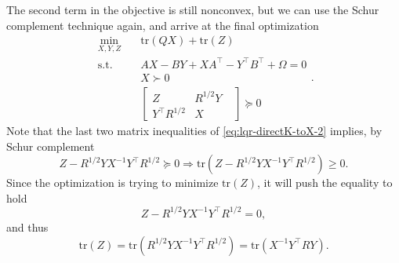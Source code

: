 \documentclass[
]{book}
\theoremstyle{definition}
\theoremstyle{definition}
\theoremstyle{definition}
\theoremstyle{definition}
\theoremstyle{remark}
\begin{document}
The second term in the objective is still nonconvex, but we can use the Schur complement technique again, and arrive at the final optimization
\begin{equation}
\begin{split}
\min_{X,Y,Z} & \quad \mathrm{tr}(QX) + \mathrm{tr}(Z) \\
\mathrm{s.t.}& \quad AX - BY + XA^\top- Y^\top B^\top+ \Omega = 0 \\
& \quad X \succ 0 \\
& \quad \begin{bmatrix} Z & R^{1/2} Y & \\ Y^\top R^{1/2} & X \end{bmatrix} \succeq 0
\end{split}.
\label{eq:lqr-directK-toX-2}
\end{equation}
Note that the last two matrix inequalities of \eqref{eq:lqr-directK-toX-2} implies, by Schur complement
\[
Z - R^{1/2}Y X^{-1}Y^\top R^{1/2} \succeq 0 \Rightarrow \mathrm{tr}(Z - R^{1/2}Y X^{-1}Y^\top R^{1/2}) \geq 0.
\]
Since the optimization is trying to minimize \(\mathrm{tr}(Z)\), it will push the equality to hold
\[
Z - R^{1/2}Y X^{-1}Y^\top R^{1/2} = 0,
\]
and thus
\[
\mathrm{tr}(Z) = \mathrm{tr}(R^{1/2}Y X^{-1}Y^\top R^{1/2}) = \mathrm{tr}(X^{-1}Y^\top R Y).
\]
\end{document}
